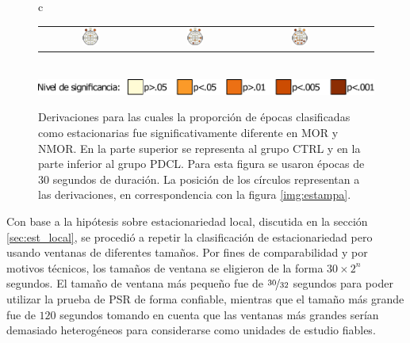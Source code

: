 \begin{figure}
\begin{tabular}{c}
\begin{tabular}{ccccc}
\includegraphics[width=0.17\textwidth]{./img_art_dfa/prop_JGZ_30.pdf} &
\includegraphics[width=0.17\textwidth]{./img_art_dfa/prop_AEFP_30.pdf} &
\includegraphics[width=0.17\textwidth]{./img_art_dfa/prop_PCM_30.pdf} \\
\end{tabular}
 \\
\includegraphics[scale=.7]{./img_art_dfa/escala.pdf} \\
\end{tabular}
\caption{Derivaciones para las cuales la proporción de épocas clasificadas como estacionarias fue significativamente diferente en MOR y NMOR.
%
En la parte superior se representa al grupo CTRL y en la parte inferior al grupo PDCL.
%
Para esta figura se usaron épocas de 30 segundos de duración.
%
La posición de los círculos representan a las derivaciones, en correspondencia con la figura \ref{img:estampa}.}
\label{cabeza_new}
\end{figure}

Con base a la hipótesis sobre estacionariedad local, discutida en la sección \ref{sec:est_local}, se procedió a repetir la clasificación de estacionariedad pero usando ventanas de diferentes tamaños.
%
Por fines de comparabilidad y por motivos técnicos, los tamaños de ventana se eligieron de la forma $30 \times 2^{n}$ segundos.
%
El tamaño de ventana más pequeño fue de $\nicefrac{30}{32}$ segundos para poder utilizar la prueba de PSR de forma confiable, mientras que el tamaño más grande fue de $120$ segundos tomando en cuenta que las ventanas más grandes serían demasiado heterogéneos para considerarse como unidades de estudio fiables.

